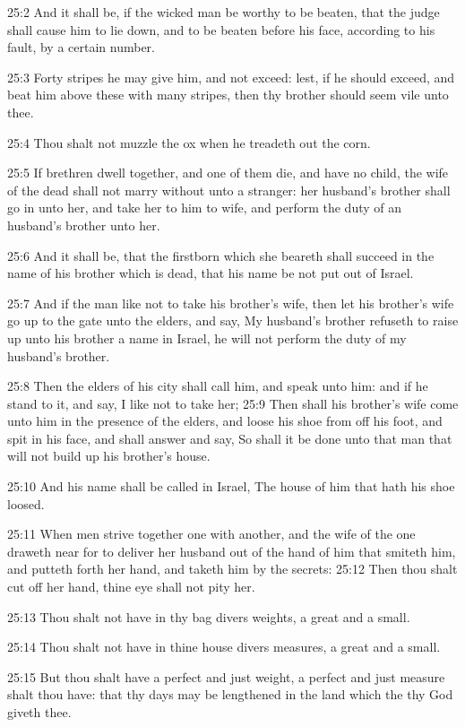 25:2 And it shall be, if the wicked man be worthy to be beaten, that
the judge shall cause him to lie down, and to be beaten before his
face, according to his fault, by a certain number.

25:3 Forty stripes he may give him, and not exceed: lest, if he should
exceed, and beat him above these with many stripes, then thy brother
should seem vile unto thee.

25:4 Thou shalt not muzzle the ox when he treadeth out the corn.

25:5 If brethren dwell together, and one of them die, and have no
child, the wife of the dead shall not marry without unto a stranger:
her husband's brother shall go in unto her, and take her to him to
wife, and perform the duty of an husband's brother unto her.

25:6 And it shall be, that the firstborn which she beareth shall
succeed in the name of his brother which is dead, that his name be not
put out of Israel.

25:7 And if the man like not to take his brother's wife, then let his
brother's wife go up to the gate unto the elders, and say, My
husband's brother refuseth to raise up unto his brother a name in
Israel, he will not perform the duty of my husband's brother.

25:8 Then the elders of his city shall call him, and speak unto him:
and if he stand to it, and say, I like not to take her; 25:9 Then
shall his brother's wife come unto him in the presence of the elders,
and loose his shoe from off his foot, and spit in his face, and shall
answer and say, So shall it be done unto that man that will not build
up his brother's house.

25:10 And his name shall be called in Israel, The house of him that
hath his shoe loosed.

25:11 When men strive together one with another, and the wife of the
one draweth near for to deliver her husband out of the hand of him
that smiteth him, and putteth forth her hand, and taketh him by the
secrets: 25:12 Then thou shalt cut off her hand, thine eye shall not
pity her.

25:13 Thou shalt not have in thy bag divers weights, a great and a
small.

25:14 Thou shalt not have in thine house divers measures, a great and
a small.

25:15 But thou shalt have a perfect and just weight, a perfect and
just measure shalt thou have: that thy days may be lengthened in the
land which the \LORD thy God giveth thee.

